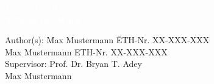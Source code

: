 %
%
%
%


\begin{titlepage}



{\sf
\vspace{5mm}
{\Huge\textcolor{white}{Master Arbeit}}\\[2mm]
{\Huge\textcolor{white}{\textbf{Title of the Work}}}

{\color{white} 
\begin{tabbing}
Author(s): \hspace{20mm} \= Max Mustermann \hspace{20mm} \= ETH-Nr. XX-XXX-XXX \\[1mm]
\> Max Mustermann \> ETH-Nr. XX-XXX-XXX\\[3mm]
Supervisor: \> Prof. Dr. Bryan T. Adey\\[1mm]
\>  Max Mustermann
\end{tabbing}
}
}
\vspace{7mm}
\begin{figure}[h!]
  \centering
  
\end{figure}










\end{titlepage}


%

